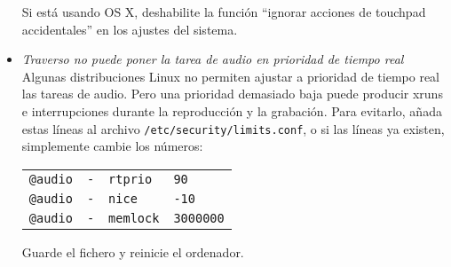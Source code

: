 \begin{itemize}
 Si está usando OS X, deshabilite la función ``ignorar acciones de touchpad accidentales'' en los ajustes del sistema.

 \item \textit{Traverso no puede poner la tarea de audio en prioridad de tiempo real}\\
 Algunas distribuciones Linux no permiten ajustar a prioridad de tiempo real las tareas de audio. Pero una prioridad demasiado baja puede producir xruns  e interrupciones durante la reproducción y la grabación. Para evitarlo, añada estas líneas al archivo \texttt{/etc/security/limits.conf}, o si las líneas ya existen, simplemente cambie los números:

\begin{tabular}{llll}
\texttt{@audio} & \texttt{-} & \texttt{rtprio} & \texttt{90}\\
\texttt{@audio} & \texttt{-} & \texttt{nice} & \texttt{-10}\\
\texttt{@audio} & \texttt{-} & \texttt{memlock} & \texttt{3000000}\\
\end{tabular}

Guarde el fichero y reinicie el ordenador.

\end{itemize}


